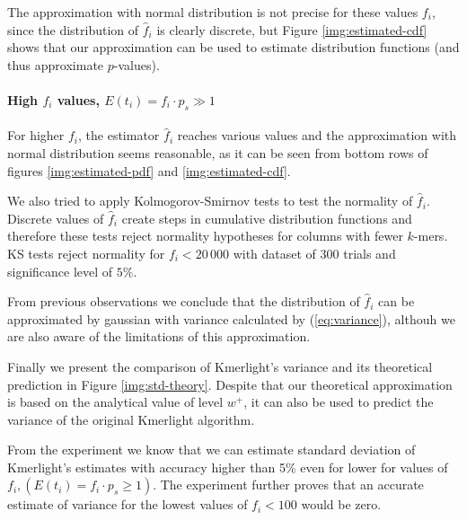 The approximation with normal distribution is not precise for these values $f_i$, since
the distribution of $\hat f_i$ is clearly discrete, but Figure \ref{img:estimated-cdf} shows
that our approximation can be used to estimate distribution functions (and thus approximate
$p$-values).

\paragraph{High $f_i$ values, $E(t_i) = f_i \cdot p_s \gg 1$}
For higher $f_i$, the estimator $\hat f_i$ reaches various values and the approximation with
normal distribution seems reasonable, as it can be seen from bottom rows of figures 
\ref{img:estimated-pdf} and \ref{img:estimated-cdf}.

\medskip

We also tried to apply Kolmogorov-Smirnov tests to test the normality of $\hat f_i$. Discrete
values of $\hat f_i$ create steps in cumulative distribution functions and therefore these
tests reject normality hypotheses for columns with fewer $k$-mers. KS tests reject normality
for $f_i < 20\,000$ with dataset of 300 trials and significance level of $5\%$. 

\medskip

From previous observations we conclude that the distribution of $\hat f_i$ can be approximated
by gaussian with variance calculated by (\ref{eq:variance}), althouh we are also aware of the
limitations of this approximation.

Finally we present the comparison of Kmerlight's variance and its theoretical prediction in
Figure \ref{img:std-theory}. Despite that our theoretical approximation is based on the 
analytical value of level $w^+$, it can also be used to predict the variance of the original 
Kmerlight algorithm. 

From the experiment we know that we can estimate standard deviation of Kmerlight's estimates
with accuracy higher than 5\% even for lower for values of $f_i,
(E(t_i) = f_i \cdot p_s \geq 1)$. The experiment further proves that an accurate estimate of
variance for the lowest values of $f_i < 100$ would be zero. 

